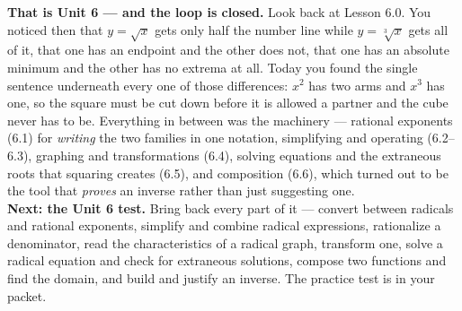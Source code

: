 \documentclass[10pt]{article}
\begin{document}
\begin{extensionbox}
\end{extensionbox}

\begin{spiralbox}
\textbf{That is Unit 6 --- and the loop is closed.} Look back at Lesson 6.0. You noticed then that
$y=\sqrt{x}$ gets only half the number line while $y=\sqrt[3]{x}$ gets all of it, that one has an
endpoint and the other does not, that one has an absolute minimum and the other has no extrema at
all. Today you found the single sentence underneath every one of those differences: $x^{2}$ has two
arms and $x^{3}$ has one, so the square must be cut down before it is allowed a partner and the cube
never has to be. Everything in between was the machinery --- rational exponents (6.1) for
\emph{writing} the two families in one notation, simplifying and operating (6.2--6.3), graphing and
transformations (6.4), solving equations and the extraneous roots that squaring creates (6.5), and
composition (6.6), which turned out to be the tool that \emph{proves} an inverse rather than just
suggesting one.
\\[4pt]
\textbf{Next: the Unit 6 test.} Bring back every part of it --- convert between radicals and rational
exponents, simplify and combine radical expressions, rationalize a denominator, read the
characteristics of a radical graph, transform one, solve a radical equation and check for
extraneous solutions, compose two functions and find the domain, and build and justify an inverse.
The practice test is in your packet.
\end{spiralbox}
\end{document}
